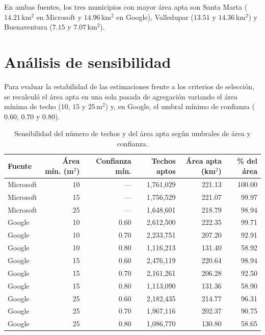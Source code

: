 \documentclass[12pt, letterpaper]{article}
\begin{document}
En ambas fuentes, los tres municipios con mayor área apta son Santa Marta ($14.21$\,km$^2$ en Microsoft y $14.96$\,km$^2$ en Google), Valledupar ($13.51$ y $14.36$\,km$^2$) y Buenaventura ($7.15$ y $7.07$\,km$^2$).

\section{Análisis de sensibilidad}\label{sec:sensibilidad}
Para evaluar la estabilidad de las estimaciones frente a los criterios de selección, se recalculó el área apta en una sola pasada de agregación variando el área mínima de techo ($10$, $15$ y $25$\,m$^2$) y, en Google, el umbral mínimo de confianza ($0.60$, $0.70$ y $0.80$).

\begin{table}[H]
\centering
\small
{}
\footnotesize\setlength{\tabcolsep}{5pt}\begin{tabular}{lrrrrr}
\toprule
\textbf{Fuente} & \textbf{Área mín. (m$^2$)} & \textbf{Confianza mín.} & \textbf{Techos aptos} & \textbf{Área apta (km$^2$)} & \textbf{\% del área} \\
\midrule
Microsoft & 10 & --- & 1{,}761{,}029 & 221.13 & 100.00 \\
Microsoft & 15 & --- & 1{,}756{,}529 & 221.07 & 99.97 \\
Microsoft & 25 & --- & 1{,}648{,}601 & 218.79 & 98.94 \\
\midrule
Google & 10 & 0.60 & 2{,}612{,}500 & 222.35 & 99.71 \\
Google & 10 & 0.70 & 2{,}233{,}751 & 207.20 & 92.91 \\
Google & 10 & 0.80 & 1{,}116{,}213 & 131.40 & 58.92 \\
Google & 15 & 0.60 & 2{,}476{,}119 & 220.64 & 98.94 \\
Google & 15 & 0.70 & 2{,}161{,}261 & 206.28 & 92.50 \\
Google & 15 & 0.80 & 1{,}113{,}090 & 131.36 & 58.90 \\
Google & 25 & 0.60 & 2{,}182{,}435 & 214.77 & 96.31 \\
Google & 25 & 0.70 & 1{,}967{,}116 & 202.37 & 90.75 \\
Google & 25 & 0.80 & 1{,}086{,}770 & 130.80 & 58.65 \\
\bottomrule
\end{tabular}
\caption{Sensibilidad del número de techos y del área apta según umbrales de área y confianza.}
\label{tab:sensibilidad}
\end{table}
\end{document}
